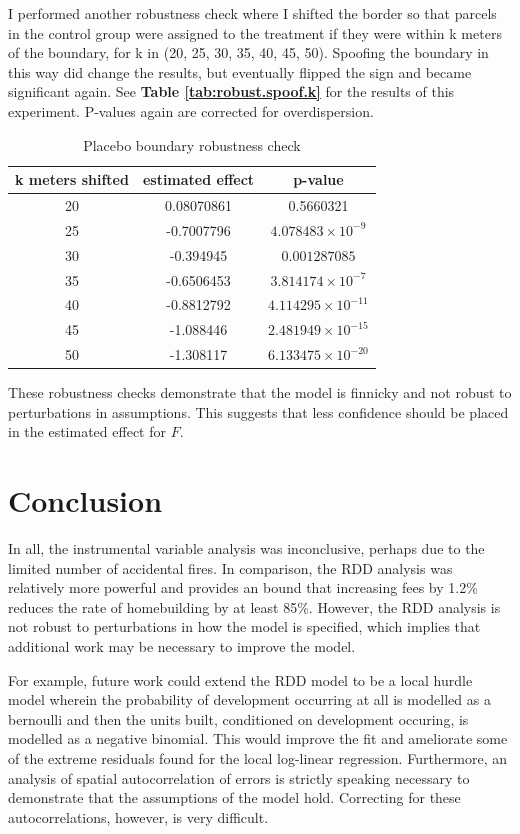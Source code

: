 \documentclass[a4paper,12pt]{article}
\begin{document}
I performed another robustness check where I shifted the border so that parcels in the control group were assigned to the treatment if they were within k meters of the boundary, for k in (20, 25, 30, 35, 40, 45, 50). Spoofing the boundary in this way did change the results, but eventually flipped the sign and became significant again. See \textbf{Table \ref{tab:robust.spoof.k}} for the results of this experiment. P-values again are corrected for overdispersion.

\begin{table}[hbpt]
\centering
\caption{Placebo boundary robustness check}
\setlength{\tabcolsep}{10pt} 
\begin{tabular}{|c|c|c|}
\hline
k meters shifted & estimated effect & p-value \\
\hline
20 & 0.08070861 & 0.5660321 \\
25 & -0.7007796 & \(4.078483 \times 10^{-9}\) \\
30 & -0.394945 & \(0.001287085\) \\
35 & -0.6506453 & \(3.814174 \times 10^{-7}\) \\
40 & -0.8812792 & \(4.114295 \times 10^{-11}\) \\
45 & -1.088446 & \(2.481949 \times 10^{-15}\) \\
50 & -1.308117 & \(6.133475 \times 10^{-20}\) \\
\hline
\end{tabular}
\end{table}
\label{tab:robust.spoof.k}

These robustness checks demonstrate that the model is finnicky and not robust to perturbations in assumptions. This suggests that less confidence should be placed in the estimated effect for $F$. 

\section{Conclusion}

In all, the instrumental variable analysis was inconclusive, perhaps due to the limited number of accidental fires. In comparison, the RDD analysis was relatively more powerful and provides an bound that increasing fees by 1.2\% reduces the rate of homebuilding by at least 85\%. However, the RDD analysis is not robust to perturbations in how the model is specified, which implies that additional work may be necessary to improve the model.

For example, future work could extend the RDD model to be a local hurdle model wherein the probability of development occurring at all is modelled as a bernoulli and then the units built, conditioned on development occuring, is modelled as a negative binomial. This would improve the fit and ameliorate some of the extreme residuals found for the local log-linear regression. Furthermore, an analysis of spatial autocorrelation of errors is strictly speaking necessary to demonstrate that the assumptions of the model hold. Correcting for these autocorrelations, however, is very difficult.\cite{wooldridge2010econometric}
\end{document}
